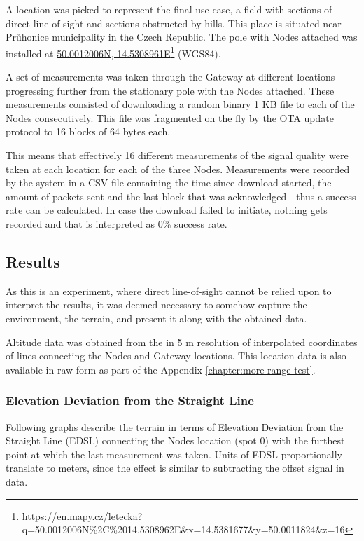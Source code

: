 A location was picked to represent the final use-case, a field with sections of direct line-of-sight and sections obstructed by hills. This place is situated near Průhonice municipality in the Czech Republic. The pole with Nodes attached was installed at \href{https://en.mapy.cz/letecka?q=50.0012006N%2C%2014.5308962E&x=14.5381677&y=50.0011824&z=16}{50.0012006N, 14.5308961E}\footnote{https://en.mapy.cz/letecka?q=50.0012006N\%2C\%2014.5308962E\&x=14.5381677\&y=50.0011824\&z=16} (WGS84).

A set of measurements was taken through the Gateway at different locations progressing further from the stationary pole with the Nodes attached. These measurements consisted of downloading a random binary 1 KB file to each of the Nodes consecutively. This file was fragmented on the fly by the OTA update protocol to 16 blocks of 64 bytes each.

This means that effectively 16 different measurements of the signal quality were taken at each location for each of the three Nodes. Measurements were recorded by the system in a CSV file containing the time since download started, the amount of packets sent and the last block that was acknowledged - thus a success rate can be calculated. In case the download failed to initiate, nothing gets recorded and that is interpreted as 0\% success rate.

\subsection{Results}
As this is an experiment, where direct line-of-sight cannot be relied upon to interpret the results, it was deemed necessary to somehow capture the environment, the terrain, and present it along with the obtained data.

Altitude data was obtained from the  in 5 m resolution of interpolated coordinates of lines connecting the Nodes and Gateway locations. This location data is also available in raw form as part of the Appendix \ref{chapter:more-range-test}.

\subsubsection{\label{section:edsl-definition}Elevation Deviation from the Straight Line}
Following graphs describe the terrain in terms of Elevation Deviation from the Straight Line (EDSL) connecting the Nodes location (spot 0) with the furthest point at which the last measurement was taken. Units of EDSL proportionally translate to meters, since the effect is similar to subtracting the offset signal in data.

